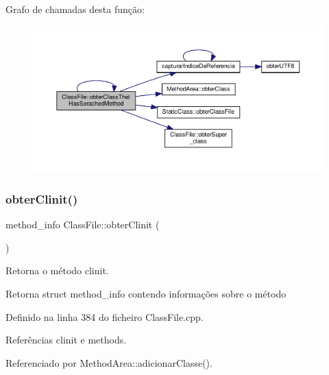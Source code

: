 Grafo de chamadas desta função\+:
\nopagebreak
\begin{figure}[H]
\begin{center}
\leavevmode
\includegraphics[width=350pt]{classClassFile_a4d0ac62c4d6218ddada33f715ebaf633_cgraph}
\end{center}
\end{figure}
\mbox{\label{classClassFile_a1141f5a8c856d5f3931f0b518e219f79}} 
\subsubsection{\texorpdfstring{obter\+Clinit()}{obterClinit()}}
{\footnotesize\ttfamily method\+\_\+info Class\+File\+::obter\+Clinit (\begin{DoxyParamCaption}{ }\end{DoxyParamCaption})}



Retorna o método clinit. 

\begin{DoxyReturn}{Retorna}
struct method\+\_\+info contendo informações sobre o método 
\end{DoxyReturn}


Definido na linha 384 do ficheiro Class\+File.\+cpp.



Referências clinit e methods.



Referenciado por Method\+Area\+::adicionar\+Classe().

\mbox{\label{classClassFile_ab70fe581c4b7a1824adf490c3a53bcc7}} 
